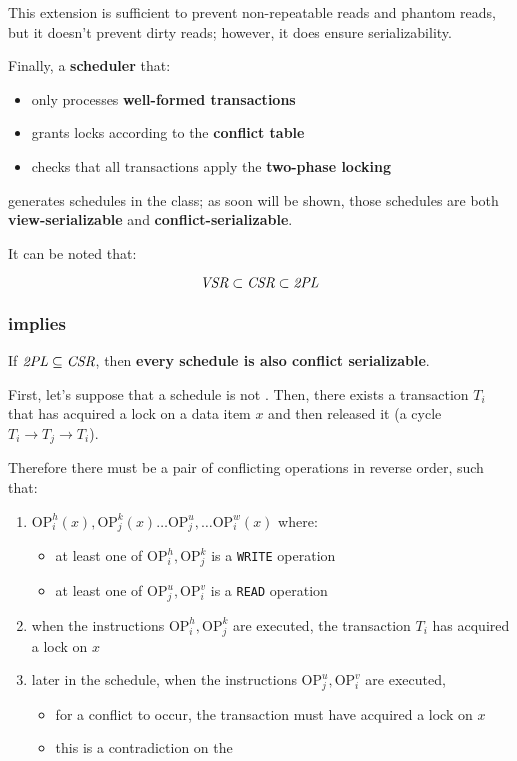 \documentclass[english]{article}
\begin{document}
This extension is sufficient to prevent non-repeatable reads and phantom reads, but it doesn't prevent dirty reads;
however, it does ensure serializability.

\bigskip
Finally, a \textbf{scheduler} that:

\begin{itemize}
  \item only processes \textbf{well-formed transactions}
  \item grants locks according to the \textbf{conflict table}
  \item checks that all transactions apply the \textbf{two-phase locking}
\end{itemize}

generates schedules in the \tpl class;
as soon will be shown, those schedules are both \textbf{view-serializable} and \textbf{conflict-serializable}.

It can be noted that:

\[ \textit{VSR} \subset \textit{CSR} \subset \textit{2PL} \]

\subsubsection{\tpl implies \csr}

If \(\textit{2PL} \subseteq \textit{CSR}\), then \textbf{every \tpl schedule is also conflict serializable}.

\bigskip
First, let's suppose that a \tpl schedule is not \csr.
Then, there exists a transaction \(T_i\) that has acquired a lock on a data item \(x\) and then released it (a cycle \(T_i \rightarrow T_j \rightarrow T_i\)).

Therefore there must be a pair of conflicting operations in reverse order, such that:

\begin{enumerate}
  \item \(\text{OP}_{i}^{h}(x), \text{OP}_{j}^{k}(x) \ldots \text{OP}_{j}^{u}, \ldots \text{OP}_{i}^{w}(x)\) where:
        \begin{itemize}
          \item at least one of \(\text{OP}_{i}^{h}, \text{OP}_{j}^{k}\) is a \texttt{WRITE} operation
          \item at least one of \(\text{OP}_{j}^{u}, \text{OP}_{i}^{v}\) is a \texttt{READ} operation
        \end{itemize}
  \item when the instructions \(\text{OP}_{i}^{h}, \text{OP}_{j}^{k}\) are executed, the transaction \(T_i\) has acquired a lock on \(x\)
  \item later in the schedule, when the instructions \(\text{OP}_{j}^{u}, \text{OP}_{i}^{v}\) are executed,
        \begin{itemize}
          \item for a conflict to occur, the transaction must have acquired a lock on \(x\)
          \item this is a contradiction on the \tpl
        \end{itemize}
\end{enumerate}
\end{document}
